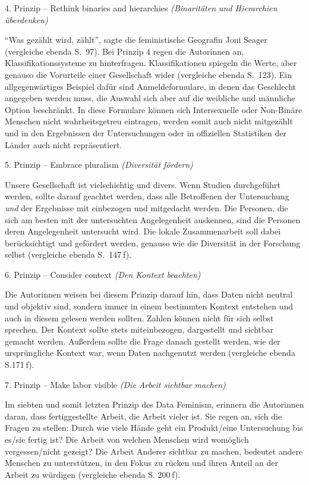 \documentclass[a4paper,
fontsize=11pt,
oneside,
numbers=noperiodatend,
parskip=half-,
bibliography=totoc,
final
]{scrartcl}
\begin{document}
4. Prinzip -- Rethink binaries and hierarchies \emph{(Binaritäten und
Hierarchien überdenken)}

\enquote{Was gezählt wird, zählt}, sagte die feministische Geografin
Joni Seager (vergleiche ebenda S.~97). Bei Prinzip 4 regen die Autorinnen an,
Klassifikationssysteme zu hinterfragen. Klassifikationen spiegeln die
Werte, aber genauso die Vorurteile einer Gesellschaft wider (vergleiche ebenda
S.~123). Ein allgegenwärtiges Beispiel dafür sind Anmeldeformulare, in
denen das Geschlecht angegeben werden muss, die Auswahl sich aber auf
die weibliche und männliche Option beschränkt. In diese Formulare können
sich Intersexuelle oder Non-Binäre Menschen nicht wahrheitsgetreu
eintragen, werden somit auch nicht mitgezählt und in den Ergebnissen der
Untersuchungen oder in offiziellen Statistiken der Länder auch nicht
repräsentiert.

5. Prinzip -- Embrace pluralism \emph{(Diversität fördern)}

Unsere Gesellschaft ist vielschichtig und divers. Wenn Studien
durchgeführt werden, sollte darauf geachtet werden, dass alle
Betroffenen der Untersuchung \emph{und} der Ergebnisse mit einbezogen
und mitgedacht werden. Die Personen, die sich am besten mit der
untersuchten Angelegenheit auskennen, sind die Personen deren
Angelegenheit untersucht wird. Die lokale Zusammenarbeit soll dabei
berücksichtigt und gefördert werden, genauso wie die Diversität in der
Forschung selbst (vergleiche ebenda S.~147 f).

6. Prinzip -- Consider context \emph{(Den Kontext beachten)}

Die Autorinnen weisen bei diesem Prinzip darauf hin, dass Daten nicht
neutral und objektiv sind, sondern immer in einem bestimmten Kontext
entstehen und auch in diesem gelesen werden sollten. Zahlen können nicht
für sich selbst sprechen. Der Kontext sollte stets miteinbezogen,
dargestellt und sichtbar gemacht werden. Außerdem sollte die Frage
danach gestellt werden, wie der ursprüngliche Kontext war, wenn Daten
nachgenutzt werden (vergleiche ebenda S.171 f).

7. Prinzip -- Make labor visible \emph{(Die Arbeit sichtbar machen)}

Im siebten und somit letzten Prinzip des Data Feminism, erinnern die
Autorinnen daran, dass fertiggestellte Arbeit, die Arbeit vieler ist.
Sie regen an, sich die Fragen zu stellen: Durch wie viele Hände geht ein
Produkt/eine Untersuchung bis es/sie fertig ist? Die Arbeit von welchen
Menschen wird womöglich vergessen/nicht gezeigt? Die Arbeit Anderer
sichtbar zu machen, bedeutet andere Menschen zu unterstützen, in den
Fokus zu rücken und ihren Anteil an der Arbeit zu würdigen (vergleiche ebenda S.
200 f).
\end{document}
